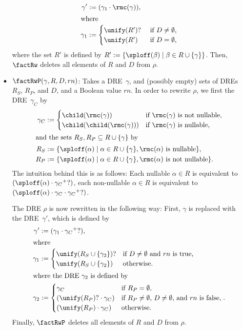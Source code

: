 \documentclass[a4paper,11pt, svgnames,titlepage]{article}
\newcommand{\rxp}{{^\mathtt{+}}}
\newcommand{\rxo}{\mathtt{?}}
\newcommand{\rxc}{\cdot}
\newcommand{\df}{:=}
\newcommand{\true}{\ensuremath{\operatorname{true}}\xspace}
\newcommand{\false}{\ensuremath{\operatorname{false}}\xspace}
\begin{document}
\begin{itemize}
\begin{align*}
	\gamma'&\df (\gamma_1\rxc \rmc(\gamma)),\\
	\shortintertext{where}
	\gamma_1&\df \begin{cases}
		\unify(R')\rxo & \text{ if $D\neq \emptyset$,}\\
		\unify(R') & \text{ if $D=\emptyset$,}
	\end{cases}
\end{align*}
where the set $R'$ is defined by $R'\df\{\sploff(\beta)\mid \beta\in R\cup\{\gamma\}\}$. Then, $\factRw$ deletes all elements of $R$ and $D$ from $\rho$.
\item $\factRwP(\gamma,R,D,rn)$: Takes a DRE~$\gamma$, and (possibly empty) sets of DREs $R_S$, $R_P$, and $D$, and a Boolean value $rn$. In order to rewrite $\rho$, we first the DRE~$\gamma_{C}$ by
\begin{align*}
	\gamma_{C}&\df \begin{cases}
		\child(\rmc(\gamma)) & \text{if $\rmc(\gamma)$ is not nullable,}\\ 
		\child(\child(\rmc(\gamma))) & \text{if $\rmc(\gamma)$ is nullable,} 
	\end{cases}\\
\intertext{and the sets $R_S, R_P\subseteq R\cup\{\gamma\}$ by}
	R_S&\df\{\sploff(\alpha)\mid\alpha\in R\cup\{\gamma\}, \rmc(\alpha)\text{ is nullable}\},\\
	R_P&\df\{\sploff(\alpha)\mid\alpha\in R\cup\{\gamma\}, \rmc(\alpha)\text{ is not nullable}\}.
\end{align*}
The intuition behind this is as follows: Each nullable $\alpha\in R$ is equivalent to $(\sploff(\alpha)\rxc \gamma_{C}\rxp\rxo)$, each non-nullable $\alpha\in R$ is equivalent to $(\sploff(\alpha)\rxc \gamma_{C}\rxc\gamma_{C}\rxp\rxo)$.

The DRE $\rho$ is now rewritten in the following way: First, $\gamma$ is replaced with the DRE~$\gamma'$, which is defined by
\begin{align*}
	\gamma'&\df (\gamma_1\rxc\gamma_{C}\rxp\rxo),\\
	\shortintertext{where}	
	\gamma_1&\df \begin{cases}
		\unify(R_S\cup\{\gamma_2\})\rxo &  \text{if $D\neq \emptyset$ and $rn$ is $\true$,}\\
		\unify(R_S\cup\{\gamma_2\}) & \text{otherwise.}
	\end{cases}\\
	\shortintertext{where the DRE~$\gamma_2$ is defined by }
	\gamma_2&\df \begin{cases}
		\gamma_{C} & \text{if $R_P=\emptyset$},\\
		(\unify(R_{P})\rxo\rxc\gamma_{C})&\text{if $R_P\neq \emptyset$, $D\neq\emptyset$, and $rn$ is $\false$},\\
		(\unify(R_{P})\rxc\gamma_{C})&\text{otherwise}.
	\end{cases}.
\end{align*}
Finally, $\factRwP$ deletes all elements of $R$ and $D$ from $\rho$.
\end{itemize}
\end{document}
